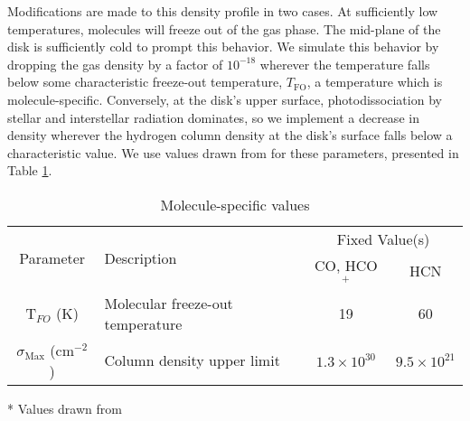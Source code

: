 
Modifications are made to this density profile in two cases. At sufficiently low temperatures, molecules will freeze out of the gas phase. The mid-plane of the disk is sufficiently cold to prompt this behavior. We simulate this behavior by dropping the gas density by a factor of $10^{-18}$ wherever the temperature falls below some characteristic freeze-out temperature, $T_\text{FO}$, a temperature which is molecule-specific. Conversely, at the disk's upper surface, photodissociation by stellar and interstellar radiation dominates, so we implement a decrease in density wherever the hydrogen column density at the disk's surface falls below a characteristic value. We use values drawn from \cite{Factor2017} for these parameters, presented in Table \ref{tab:mol_specifics}.


\begin{table}
  \begin{threeparttable}
    \centering
    \caption{Molecule-specific values}
    \label{tab:mol_specifics}
    \renewcommand{\arraystretch}{1.2}
    \begin{tabular}{c  l  c c }
      \toprule \toprule
      \multirow{2}{*}{Parameter} & \multirow{2}{*}{Description}    & \multicolumn{2}{c}{Fixed Value(s)} \\
                                 &                                 & CO, HCO$^+$ & HCN \\
      \midrule %
      T$_{FO}$ (K)           &  Molecular freeze-out temperature   &  19 & 60    \\
      $\sigma_\text{Max}$ (cm$^{-2}$) & Column density upper limit &  $1.3 \times 10^{30}$ & $9.5 \times 10^{21}$  \\
      \bottomrule
    \end{tabular}
    \begin{tablenotes}\footnotesize
      \item[*] Values drawn from \cite{Factor2017}
    \end{tablenotes}
  \end{threeparttable}
\end{table}



